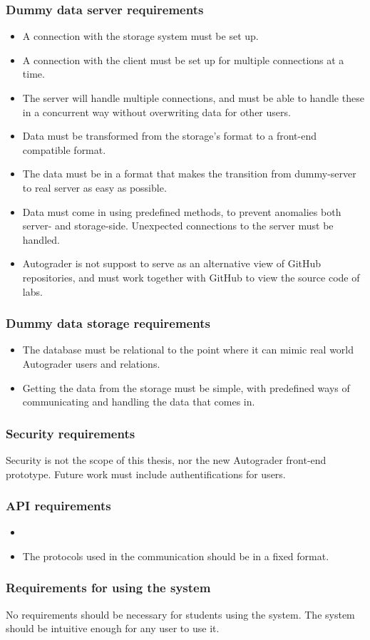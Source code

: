 \subsubsection{Dummy data server requirements}
\begin{itemize}
\item A connection with the storage system must be set up.
\item A connection with the client must be set up for multiple connections at a time.
\item The server will handle multiple connections, and must be able to handle these in a concurrent way without overwriting data for other users.
\item Data must be transformed from the storage's format to a front-end compatible format.
\item The data must be in a format that makes the transition from dummy-server to real server as easy as possible.
\item Data must come in using predefined methods, to prevent anomalies both server- and storage-side. Unexpected connections to the server must be handled.
\item Autograder is not suppost to serve as an alternative view of GitHub repositories, and must work together with GitHub to view the source code of labs.
\end{itemize}

\subsubsection{Dummy data storage requirements}
\begin{itemize}
\item The database must be relational to the point where it can mimic real world Autograder users and relations.
\item Getting the data from the storage must be simple, with predefined ways of communicating and handling the data that comes in.
\end{itemize}

\subsubsection{Security requirements}
Security is not the scope of this thesis, nor the new Autograder front-end prototype. Future work must include authentifications for users.

\subsubsection{API requirements}
\begin{itemize}
\item 
\item The protocols used in the communication should be in a fixed format.
\end{itemize}
\subsubsection{Requirements for using the system}
No requirements should be necessary for students using the system. The system should be intuitive enough for any user to use it.
